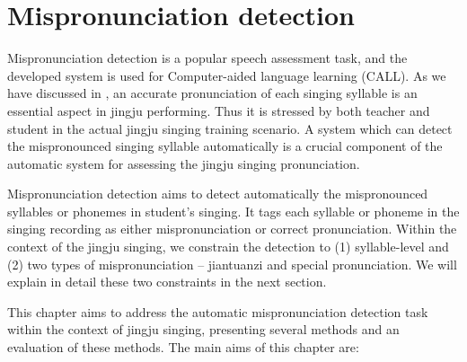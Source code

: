 \chapter{Mispronunciation detection}\label{chap:mispronunciation}
Mispronunciation detection is a popular speech assessment task, and the developed system is used for Computer-aided language learning (CALL). As we have discussed in , an accurate pronunciation of each singing syllable is an essential aspect in jingju performing. Thus it is stressed by both teacher and student in the actual jingju singing training scenario. A system which can detect the mispronounced singing syllable automatically is a crucial component of the automatic system for assessing the jingju singing pronunciation.

Mispronunciation detection aims to detect automatically the mispronounced syllables or phonemes in student's singing. It tags each syllable or phoneme in the singing recording as either mispronunciation or correct pronunciation. Within the context of the jingju singing, we constrain the detection to (1) syllable-level and (2) two types of mispronunciation -- jiantuanzi and special pronunciation. We will explain in detail these two constraints in the next section. 

This chapter aims to address the automatic mispronunciation detection task within the context of jingju singing, presenting several methods and an evaluation of these methods. The main aims of this chapter are:

